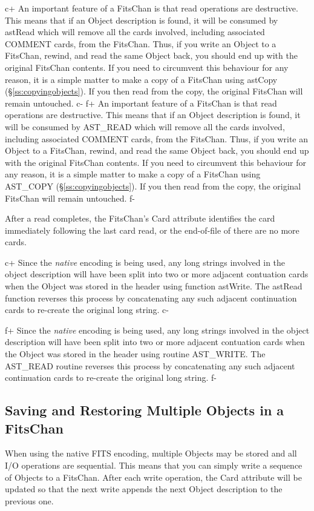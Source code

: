 \documentclass[twoside,11pt]{article}
\newcommand{\secref}[1]{\S\ref{#1}}
\newcommand{\secref}[1]{\ref{#1}}
\begin{document}
c+
An important feature of a FitsChan is that read operations are
destructive. This means that if an Object description is found, it
will be consumed by astRead which will remove all the cards involved,
including associated COMMENT cards, from the FitsChan. Thus, if you
write an Object to a FitsChan, rewind, and read the same Object back,
you should end up with the original FitsChan contents.  If you need to
circumvent this behaviour for any reason, it is a simple matter to
make a copy of a FitsChan using astCopy
(\secref{ss:copyingobjects}). If you then read from the copy, the
original FitsChan will remain untouched.
c-
f+
An important feature of a FitsChan is that read operations are
destructive. This means that if an Object description is found, it
will be consumed by AST\_READ which will remove all the cards
involved, including associated COMMENT cards, from the FitsChan. Thus,
if you write an Object to a FitsChan, rewind, and read the same Object
back, you should end up with the original FitsChan contents.  If you
need to circumvent this behaviour for any reason, it is a simple
matter to make a copy of a FitsChan using AST\_COPY
(\secref{ss:copyingobjects}). If you then read from the copy, the
original FitsChan will remain untouched.
f-

After a read completes, the FitsChan's Card attribute identifies the
card immediately following the last card read, or the end-of-file of
there are no more cards.

c+
Since the {\em native} encoding is being used, any long strings involved
in the object description will have been split into two or more adjacent
contuation cards when the Object was stored in the header using function
astWrite. The astRead function reverses this process by concatenating any
such adjacent continuation cards to re-create the original long string.
c-

f+
Since the {\em native} encoding is being used, any long strings involved
in the object description will have been split into two or more adjacent
contuation cards when the Object was stored in the header using routine
AST\_WRITE. The AST\_READ routine reverses this process by concatenating
any such adjacent continuation cards to re-create the original long
string.
f-

\subsection{Saving and Restoring Multiple Objects in a FitsChan}

When using the native FITS encoding, multiple Objects may be stored
and all I/O operations are sequential.  This means that you can simply
write a sequence of Objects to a FitsChan. After each write operation,
the Card attribute will be updated so that the next write appends the
next Object description to the previous one.
\end{document}
